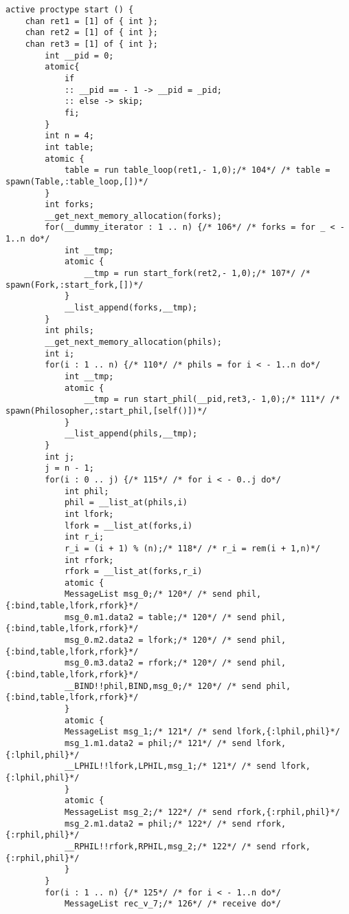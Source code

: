 \begin{lstlisting}[xleftmargin=.001\linewidth, xrightmargin=0.001\linewidth, caption={Dining Philosophers Promela translation.}, label={lst:promela_dp}]
    active proctype start () {
    chan ret1 = [1] of { int };
    chan ret2 = [1] of { int };
    chan ret3 = [1] of { int };
        int __pid = 0;
        atomic{
            if
            :: __pid == - 1 -> __pid = _pid;
            :: else -> skip;
            fi;
        }
        int n = 4;
        int table;
        atomic {
            table = run table_loop(ret1,- 1,0);/* 104*/ /* table = spawn(Table,:table_loop,[])*/ 
        }
        int forks;
        __get_next_memory_allocation(forks);
        for(__dummy_iterator : 1 .. n) {/* 106*/ /* forks = for _ < - 1..n do*/ 
            int __tmp;
            atomic {
                __tmp = run start_fork(ret2,- 1,0);/* 107*/ /* spawn(Fork,:start_fork,[])*/ 
            }
            __list_append(forks,__tmp);
        }
        int phils;
        __get_next_memory_allocation(phils);
        int i;
        for(i : 1 .. n) {/* 110*/ /* phils = for i < - 1..n do*/ 
            int __tmp;
            atomic {
                __tmp = run start_phil(__pid,ret3,- 1,0);/* 111*/ /* spawn(Philosopher,:start_phil,[self()])*/ 
            }
            __list_append(phils,__tmp);
        }
        int j;
        j = n - 1;
        for(i : 0 .. j) {/* 115*/ /* for i < - 0..j do*/ 
            int phil;
            phil = __list_at(phils,i)
            int lfork;
            lfork = __list_at(forks,i)
            int r_i;
            r_i = (i + 1) % (n);/* 118*/ /* r_i = rem(i + 1,n)*/ 
            int rfork;
            rfork = __list_at(forks,r_i)
            atomic {
            MessageList msg_0;/* 120*/ /* send phil,{:bind,table,lfork,rfork}*/ 
            msg_0.m1.data2 = table;/* 120*/ /* send phil,{:bind,table,lfork,rfork}*/ 
            msg_0.m2.data2 = lfork;/* 120*/ /* send phil,{:bind,table,lfork,rfork}*/ 
            msg_0.m3.data2 = rfork;/* 120*/ /* send phil,{:bind,table,lfork,rfork}*/ 
            __BIND!!phil,BIND,msg_0;/* 120*/ /* send phil,{:bind,table,lfork,rfork}*/ 
            }
            atomic {
            MessageList msg_1;/* 121*/ /* send lfork,{:lphil,phil}*/ 
            msg_1.m1.data2 = phil;/* 121*/ /* send lfork,{:lphil,phil}*/ 
            __LPHIL!!lfork,LPHIL,msg_1;/* 121*/ /* send lfork,{:lphil,phil}*/ 
            }
            atomic {
            MessageList msg_2;/* 122*/ /* send rfork,{:rphil,phil}*/ 
            msg_2.m1.data2 = phil;/* 122*/ /* send rfork,{:rphil,phil}*/ 
            __RPHIL!!rfork,RPHIL,msg_2;/* 122*/ /* send rfork,{:rphil,phil}*/ 
            }
        }
        for(i : 1 .. n) {/* 125*/ /* for i < - 1..n do*/ 
            MessageList rec_v_7;/* 126*/ /* receive do*/ 

\end{lstlisting}
